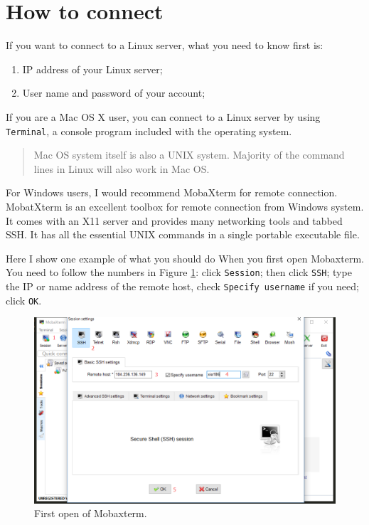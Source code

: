 \documentclass[]{book}
\begin{document}
\hypertarget{how-to-connect}{%
\section{How to connect}\label{how-to-connect}}

If you want to connect to a Linux server, what you need to know first is:

\begin{enumerate}
\def\labelenumi{\arabic{enumi})}
\item
  IP address of your Linux server;
\item
  User name and password of your account;
\end{enumerate}

If you are a Mac OS X user, you can connect to a Linux server by using \texttt{Terminal}, a console program included with the operating system.

\begin{quote}
Mac OS system itself is also a UNIX system. Majority of the command lines in Linux will also work in Mac OS.
\end{quote}

For Windows users, I would recommend MobaXterm for remote connection. MobatXterm is an excellent toolbox for remote connection from Windows system. It comes with an X11 server and provides many networking tools and tabbed SSH. It has all the essential UNIX commands in a single portable executable file.

Here I show one example of what you should do When you first open Mobaxterm. You need to follow the numbers in Figure \ref{fig:mobaxtermInit}: click \texttt{Session}; then click \texttt{SSH}; type the IP or name address of the remote host, check \texttt{Specify\ username} if you need; click \texttt{OK}.



\begin{figure}
\centering
\includegraphics{figures/mobaxterm_init.png}
\caption{\label{fig:mobaxtermInit}First open of Mobaxterm.}
\end{figure}
\end{document}
